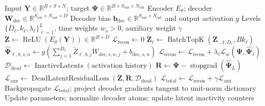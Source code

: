 \begin{algorithm}[h]
\caption{Training step with one latent vector per input window}
\label{algorithm:sed_model_training}
\begin{algorithmic}[1]
\Require Input $\mathbf{Y}\in\mathbb{R}^{B\times S\times N}$; target $\mathbf{\Psi}\in\mathbb{R}^{B\times S_{\mathrm{out}}\times N_{\mathrm{out}}}$
\Require Encoder $E_\theta$; decoder $\mathbf{W}_{\mathrm{dec}}\in\mathbb{R}^{S_{\mathrm{out}}\times N_{\mathrm{out}}\times D}$
\Require Decoder bias $\mathbf{b}_{\mathrm{dec}}\in\mathbb{R}^{S_{\mathrm{out}}\times N_{\mathrm{out}}}$ and output activation $g$
\Require Levels $\{D_\ell,k_\ell,\lambda_\ell\}_{\ell=1}^{L}$, time weights $w_s>0$, auxiliary weight $\gamma$
    \State $\mathbf{Z}\gets\operatorname{ReLU}(E_\theta(\mathbf{Y}))\in\mathbb{R}^{B\times D}$
    \State $\mathcal{L}_{\mathrm{recon}}\gets0$
        \State $\tilde{\mathbf{Z}}_\ell\gets\operatorname{BatchTopK}(\mathbf{Z}_{:,1:D_\ell},Bk_\ell)$
        \State $\hat{\mathbf{\Psi}}_{\ell,b,s,n}\gets g\!\left(\sum_{j=1}^{D_\ell}\tilde Z_{\ell,b,j}W_{\mathrm{dec},s,n,j}+b_{\mathrm{dec},s,n}\right)$
        \State $\mathcal{L}_{\mathrm{recon}}\gets\mathcal{L}_{\mathrm{recon}}+\lambda_\ell\mathcal{L}_{w}(\mathbf{\Psi},\hat{\mathbf{\Psi}}_\ell)$
    \EndFor
    \State $\mathcal{D}_{\mathrm{dead}}\gets\operatorname{InactiveLatents}(\text{activation history})$
    \State $\mathbf{R}\gets\mathbf{\Psi}-\operatorname{stopgrad}(\hat{\mathbf{\Psi}}_L)$
    \State $\mathcal{L}_{\mathrm{aux}}\gets\operatorname{DeadLatentResidualLoss}(\mathbf{Z},\mathbf{R},\mathcal{D}_{\mathrm{dead}})$
    \State $\mathcal{L}_{\mathrm{total}}\gets\mathcal{L}_{\mathrm{recon}}+\gamma\mathcal{L}_{\mathrm{aux}}$
    \State Backpropagate $\mathcal{L}_{\mathrm{total}}$; project decoder gradients tangent to unit-norm dictionary
    \State Update parameters; normalize decoder atoms; update latent inactivity counters
\EndProcedure
\end{algorithmic}
\end{algorithm}

